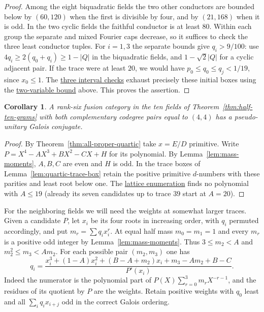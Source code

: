 \documentclass[11pt,reqno]{amsart}
\newcommand{\codecheck}[2]{\href{https://github.com/sebastienpalcoux/grothendieck-ring-classification/blob/d5750105bb5758f3ad38d2e5464dfcc12c019816/supplements/rank6/sphericality/#1}{#2}}
\newtheorem{corollary}[theorem]{Corollary}
\theoremstyle{remark}\newtheorem{remark}[theorem]{Remark}
\numberwithin{equation}{section}
\begin{document}
\begin{proof}
Among the eight biquadratic fields the two other conductors are
bounded below by $(60,120)$ when the first is divisible by four,
and by $(21,168)$ when it is odd. In the two cyclic fields the
faithful conductor is at least $80$. Within each group the separate
and mixed Fourier caps decrease, so it suffices to check the three
least conductor tuples. For $i=1,3$ the separate bounds give
$q_i>9/100$: use $4q_i\ge 2(q_0+q_i)\ge1-|Q|$ in the
biquadratic fields, and $1-\sqrt2|Q|$ for a cyclic adjacent pair.
If the trace were at least $20$, we would have $p_0\le q_0\le
q_j<1/19$, since $x_0\le1$. The
\codecheck{quartic_more/ten_half_height.py}{three interval checks}
exhaust precisely these initial boxes using the
\codecheck{quartic_more/half_bound.py}{two-variable bound} above.
This proves the assertion.
\end{proof}

\begin{corollary}\label{cor:quartic-half-ten-exclusion}
A rank-six fusion category in the ten fields of
Theorem~\ref{thm:half-ten-grams} with both complementary codegree pairs
equal to $(4,4)$ has a pseudo-unitary Galois conjugate.
\end{corollary}
\begin{proof}
By Theorem~\ref{thm:all-proper-quartic} take $x=E/D$ primitive.
Write $P=X^4-AX^3+BX^2-CX+H$ for its polynomial. By
Lemma~\ref{lem:mass-moments}, $A,B,C$ are even and $H$ is odd.
In the trace boxes of Lemma~\ref{lem:quartic-trace-box} retain the
positive primitive $d$-numbers with these parities and least root
below one. The \codecheck{verify_quartic_half_ten.py}{lattice enumeration}
finds no polynomial with $A\le19$ (already its seven candidates
up to trace $39$ start at $A=20$).
\end{proof}

For the neighboring fields we will need the weights at somewhat
larger traces. Given a candidate $P$, let $x_i$ be its four roots
in increasing order, with $q_i$ permuted accordingly, and put
$m_r=\sum q_i x_i^r$. At equal half mass $m_0=m_1=1$ and every
$m_r$ is a positive odd integer by Lemma~\ref{lem:mass-moments}.
Thus $3\le m_2<A$ and $m_2^2\le m_3<A m_2$.
For each possible pair $(m_2,m_3)$ one has
\begin{equation}\label{eq:quartic-recovered-weights}
 q_i=\frac{x_i^3+(1-A)x_i^2+(B-A+m_2)x_i+
                        m_3-Am_2+B-C}{P'(x_i)} .
\end{equation}
Indeed the numerator is the polynomial part of
$P(X)\sum_{r=0}^3m_rX^{-r-1}$, and the residues of its quotient
by $P$ are the weights. Retain positive weights with $q_0$ least
and all $\sum_i q_ix_{i+j}$ odd in the correct Galois ordering.
\end{document}
